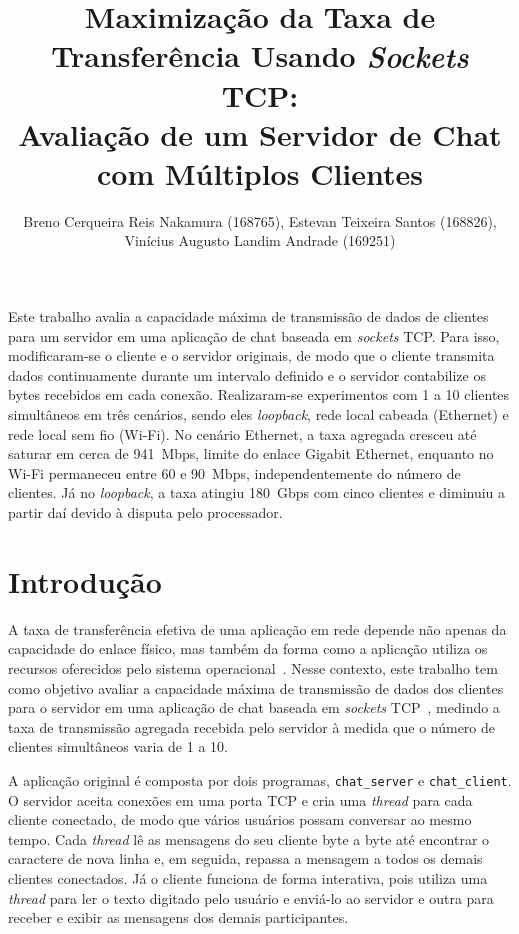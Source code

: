 \documentclass[12pt]{article}
\title{Maximização da Taxa de Transferência Usando \textit{Sockets} TCP:\\ Avaliação de um Servidor de Chat com Múltiplos Clientes}
\author{
	Breno Cerqueira Reis Nakamura (168765),
	Estevan Teixeira Santos (168826),
	\\Vinícius Augusto Landim Andrade (169251)
}
\begin{document}
\maketitle
\vspace{-1cm}
\begin{resumo}
  Este trabalho avalia a capacidade máxima de transmissão de dados de clientes
  para um servidor em uma aplicação de chat baseada em \textit{sockets} TCP.
  Para isso, modificaram-se o cliente e o servidor originais, de modo que o
  cliente transmita dados continuamente durante um intervalo definido e o
  servidor contabilize os bytes recebidos em cada conexão. Realizaram-se
  experimentos com 1 a 10 clientes simultâneos em três cenários, sendo eles
  \textit{loopback}, rede local cabeada (Ethernet) e rede local sem fio (Wi-Fi).
  No cenário Ethernet, a taxa
  agregada cresceu até saturar em cerca de 941~Mbps, limite do enlace Gigabit
  Ethernet, enquanto no Wi-Fi permaneceu entre 60 e 90~Mbps, independentemente
  do número de clientes. Já no \textit{loopback}, a taxa atingiu 180~Gbps com
  cinco clientes e diminuiu a partir daí devido à disputa pelo processador.
\end{resumo}


\section{Introdução}

A taxa de transferência efetiva de uma aplicação em rede depende não apenas da
capacidade do enlace físico, mas também da forma como a aplicação utiliza os
recursos oferecidos pelo sistema operacional~\cite{kurose:21,tanenbaum:21}. Nesse contexto, este trabalho tem
como objetivo avaliar a capacidade máxima de transmissão de dados dos clientes
para o servidor em uma aplicação de chat baseada em \textit{sockets} TCP~\cite{rfc9293,stevens:03},
medindo a taxa de transmissão agregada recebida pelo servidor à medida que o
número de clientes simultâneos varia de 1 a 10.

A aplicação original é composta por dois programas, \texttt{chat\_server} e
\texttt{chat\_client}. O servidor aceita conexões em uma porta TCP e cria uma
\textit{thread} para cada cliente conectado, de modo que vários usuários possam
conversar ao mesmo tempo. Cada \textit{thread} lê as mensagens do seu cliente
byte a byte até encontrar o caractere de nova linha e, em seguida, repassa a
mensagem a todos os demais clientes conectados. Já o cliente funciona de forma
interativa, pois utiliza uma \textit{thread} para ler o texto digitado pelo
usuário e enviá-lo ao servidor e outra para receber e exibir as mensagens dos
demais participantes.
\end{document}
